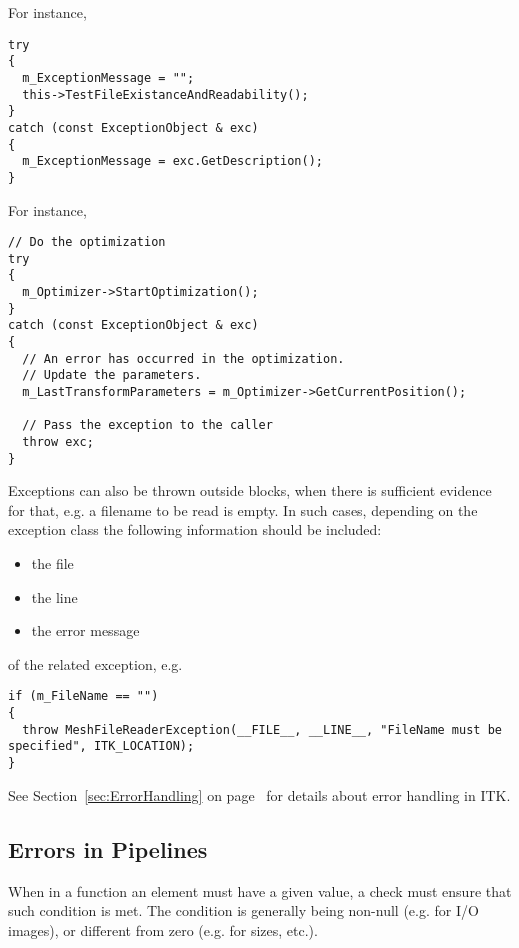 For instance,

\small
\begin{verbatim}
try
{
  m_ExceptionMessage = "";
  this->TestFileExistanceAndReadability();
}
catch (const ExceptionObject & exc)
{
  m_ExceptionMessage = exc.GetDescription();
}
\end{verbatim}
\normalsize

For instance,

\small
\begin{verbatim}
// Do the optimization
try
{
  m_Optimizer->StartOptimization();
}
catch (const ExceptionObject & exc)
{
  // An error has occurred in the optimization.
  // Update the parameters.
  m_LastTransformParameters = m_Optimizer->GetCurrentPosition();

  // Pass the exception to the caller
  throw exc;
}
\end{verbatim}
\normalsize

Exceptions can also be thrown outside  blocks, when there is
sufficient evidence for that, e.g. a filename to be read is empty. In such
cases, depending on the exception class the following information should be
included:
\begin{itemize}
\item the file
\item the line
\item the error message
\end{itemize}
of the related exception, e.g.

\small
\begin{verbatim}
if (m_FileName == "")
{
  throw MeshFileReaderException(__FILE__, __LINE__, "FileName must be specified", ITK_LOCATION);
}
\end{verbatim}
\normalsize

See Section~\ref{sec:ErrorHandling} on page~\pageref{sec:ErrorHandling} for
details about error handling in ITK.


\subsection{Errors in Pipelines}
\label{subsec:ErrorsInPipelines}

When in a function an element must have a given value, a check must ensure that
such condition is met. The condition is generally being non-null (e.g. for I/O
images), or different from zero (e.g. for sizes, etc.).


